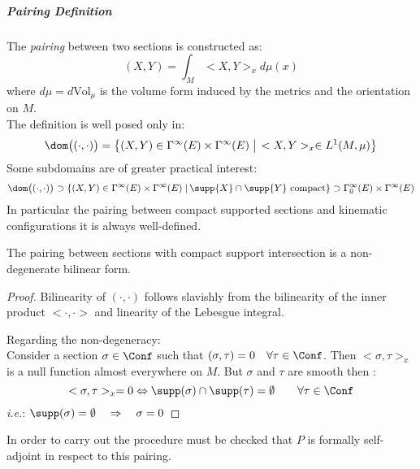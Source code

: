 \documentclass[Main]{subfiles}
\begin{document}
			
			\subparagraph{Pairing Definition}
			
				The \emph{pairing} between two sections is constructed as:
   					\begin{displaymath}
   								(X,Y) = \int_M <X,Y>_x d\mu(x)
   					\end{displaymath}
   				where $d\mu = d\textrm{Vol}_\mu$ is the volume form induced by the metrics and the orientation on $M$.\\
   				The definition is well posed only in:
   				\begin{displaymath}
   					\dom\big( (\cdot, \cdot) \big) = 
   					\big\{(X,Y) \in \Gamma^\infty(E) \times \Gamma^\infty(E) \; \big\vert \,  <X,Y>_x \in L^1(M,\mu)\big \}
   				\end{displaymath}
   				Some subdomains are of greater practical interest:
   				\begin{displaymath}
   					\dom\big( (\cdot, \cdot) \big) \supset \{ (X,Y) \in \Gamma^\infty(E) \times \Gamma^\infty(E) \; \vert \, \supp{X} \cap \supp{Y} \textrm{ compact} \} \supset \Gamma^\infty_0 (E) \times \Gamma^\infty(E)
   				\end{displaymath}
   				In particular the pairing between compact supported sections and kinematic configurations it is always well-defined.
   				\begin{proposition}
   					The pairing between sections with compact support intersection is a non-degenerate bilinear form.
   				\end{proposition}
   				\begin{proof}
					Bilinearity of $(\cdot,\cdot)$ follows slavishly from the bilinearity of the inner product $<\cdot,\cdot>$ and linearity of the Lebesgue integral.
					
					Regarding the non-degeneracy:\\
   					Consider a section $\sigma \in \Conf$ such that $(\sigma, \tau) = 0 \quad \forall \tau \in \Conf$.
   					Then $<\sigma, \tau>_x$ is a null function almost everywhere on $M$.
   					But $\sigma$ and $\tau$ are smooth then :
   					\begin{displaymath}
   						<\sigma, \tau >_x = 0 \Leftrightarrow \supp(\sigma) \cap \supp(\tau) = \emptyset \qquad \forall \tau \in \Conf
   					\end{displaymath}
   					\textit{i.e.}: $\supp(\sigma) = \emptyset \quad \Rightarrow \quad \sigma=0$
   				\end{proof}
   				
   				In order to carry out the procedure must be checked that $P$ is formally self-adjoint in respect to this pairing.
\end{document}
